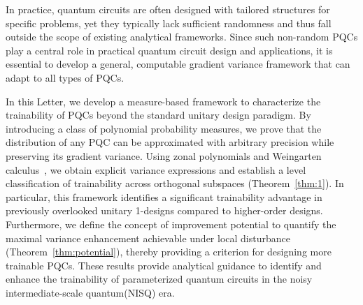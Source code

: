 \documentclass[%
 reprint,
 superscriptaddress,
 amsmath,amssymb,
 aps, prl, twocolumn, showpacs,
]{revtex4-2}
\begin{document}

In practice, quantum circuits are often designed with tailored structures for specific problems,  yet they typically lack sufficient randomness and thus fall outside the scope of existing analytical frameworks.
Since such non-random PQCs play a central role in practical quantum circuit design and applications, it is essential to develop a general, computable gradient variance framework that can adapt to all types of PQCs.

In this Letter, we develop a measure-based framework to characterize the trainability of PQCs beyond the standard unitary design paradigm. 
By introducing a class of polynomial probability measures, we prove that the distribution of any PQC can be approximated with arbitrary precision while preserving its gradient variance.
Using zonal polynomials and Weingarten calculus~\cite{weingarten1978asymptotic, collins2003moments, collins2006integration}, we obtain explicit variance expressions and establish a level classification of trainability across orthogonal subspaces (Theorem~\ref{thm:1}).
In particular, this framework identifies a significant trainability advantage in previously overlooked unitary 1-designs compared to higher-order designs. 
Furthermore, we define the concept of improvement potential to quantify the maximal variance enhancement achievable under local disturbance (Theorem~\ref{thm:potential}), thereby providing a criterion for designing more trainable PQCs. These results provide analytical guidance to identify and enhance the trainability of parameterized quantum circuits in the noisy intermediate-scale quantum(NISQ) era.
\end{document}
